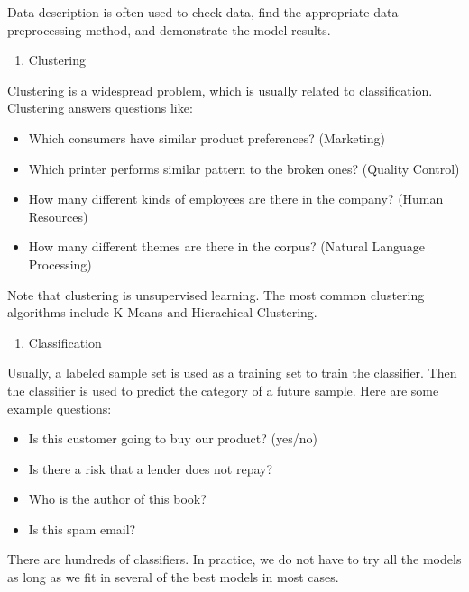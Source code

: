 \documentclass[12pt,]{krantz}
\providecommand{\tightlist}{%
  \setlength{\itemsep}{0pt}\setlength{\parskip}{0pt}}
\theoremstyle{definition}
\theoremstyle{definition}
\theoremstyle{remark}
\begin{document}
Data description is often used to check data, find the appropriate data
preprocessing method, and demonstrate the model results.

\begin{enumerate}
\def\labelenumi{\arabic{enumi}.}
\setcounter{enumi}{2}
\tightlist
\item
  Clustering
\end{enumerate}

Clustering is a widespread problem, which is usually related to
classification. Clustering answers questions like:

\begin{itemize}
\tightlist
\item
  Which consumers have similar product preferences? (Marketing)
\item
  Which printer performs similar pattern to the broken ones? (Quality
  Control)
\item
  How many different kinds of employees are there in the company? (Human
  Resources)
\item
  How many different themes are there in the corpus? (Natural Language
  Processing)
\end{itemize}

Note that clustering is unsupervised learning. The most common
clustering algorithms include K-Means and Hierachical Clustering.

\begin{enumerate}
\def\labelenumi{\arabic{enumi}.}
\setcounter{enumi}{3}
\tightlist
\item
  Classification
\end{enumerate}

Usually, a labeled sample set is used as a training set to train the
classifier. Then the classifier is used to predict the category of a
future sample. Here are some example questions:

\begin{itemize}
\tightlist
\item
  Is this customer going to buy our product? (yes/no)
\item
  Is there a risk that a lender does not repay?
\item
  Who is the author of this book?
\item
  Is this spam email?
\end{itemize}

There are hundreds of classifiers. In practice, we do not have to try
all the models as long as we fit in several of the best models in most
cases.
\end{document}
